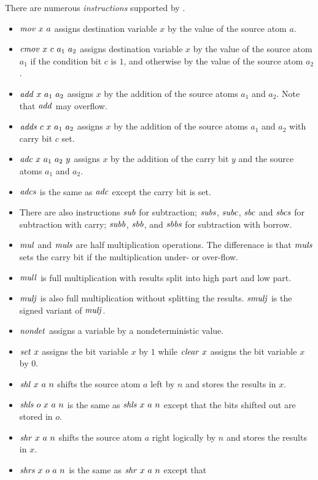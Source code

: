 \documentclass{article}
\begin{document}
There are numerous \emph{instructions} supported by \cryptoline.
\begin{itemize}
\item $\mathit{mov}\ x\ a$ assigns destination variable $x$ by the value of
  the source atom $a$.
\item $\mathit{cmov}\ x\ c\ a_1\ a_2$ assigns destination variable $x$ by the
  value of the source atom $a_1$ if the condition bit $c$ is $1$, and
  otherwise by the value of the source atom $a_2$.
\item $\mathit{add}\ x\ a_1\ a_2$ assigns $x$ by the addition of the source
  atoms $a_1$ and $a_2$.
  Note that $\mathit{add}$ may overflow.
\item $\mathit{adds}\ c\ x\ a_1\ a_2$ assigns $x$ by the addition of the
  source atoms $a_1$ and $a_2$ with carry bit $c$ set.
\item $\mathit{adc}\ x\ a_1\ a_2\ y$ assigns $x$ by the addition of the carry
  bit $y$ and the source atoms $a_1$ and $a_2$.
\item $\mathit{adcs}$ is the same as $\mathit{adc}$ except the carry bit is set.
\item There are also instructions $\mathit{sub}$ for subtraction; $\mathit{subs}$, $\mathit{subc}$,
  $\mathit{sbc}$ and $\mathit{sbcs}$ for subtraction with carry; $\mathit{subb}$, $\mathit{sbb}$,
  and $\mathit{sbbs}$ for subtraction with borrow.
\item $\mathit{mul}$ and $\mathit{muls}$ are half multiplication operations.
  The differenace is that $\mathit{muls}$ sets the carry bit if the
  multiplication under- or over-flow.
\item $\mathit{mull}$ is full multiplication with results split into high
  part and low part.
\item $\mathit{mulj}$ is also full multiplication without splitting the
  results. $\mathit{smulj}$ is the signed variant of $\mathit{mulj}$.
\item $\mathit{nondet}$ assigns a variable by a nondeterministic value.
\item $\mathit{set}\ x$ assigns the bit variable $x$ by $1$ while $\mathit{clear}\
  x$ assigns the bit variable $x$ by $0$.
\item $\mathit{shl}\ x\ a\ n$ shifts the source atom $a$ left by $n$ and
  stores the results in $x$.
\item $\mathit{shls}\ o\ x\ a\ n$ is the same as $\mathit{shls}\ x\ a\ n$ except
  that the bits shifted out are stored in $o$.
\item $\mathit{shr}\ x\ a\ n$ shifts the source atom $a$ right logically by
  $n$ and stores the results in $x$.
\item $\mathit{shrs}\ x\ o\ a\ n$ is the same as $\mathit{shr}\ x\ a\ n$ except that

\end{itemize}
\end{document}
